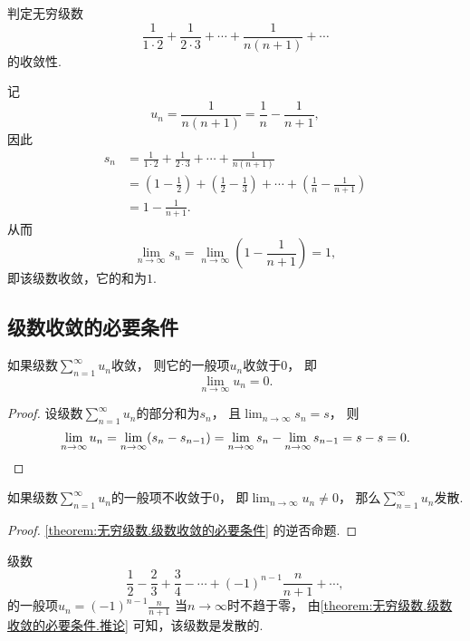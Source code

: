 \begin{example}
判定无穷级数\[
\frac{1}{1\cdot2}+\frac{1}{2\cdot3}+\dotsb+\frac{1}{n(n+1)}+\dotsb
\]的收敛性.
\begin{solution}
记\[
	u_n = \frac{1}{n(n+1)} = \frac{1}{n}-\frac{1}{n+1},
\]
因此\begin{align*}
	s_n &= \frac{1}{1\cdot2}+\frac{1}{2\cdot3}+\dotsb+\frac{1}{n(n+1)} \\
	&= \left(1-\frac{1}{2}\right)+\left(\frac{1}{2}-\frac{1}{3}\right)
	+\dotsb+\left(\frac{1}{n}-\frac{1}{n+1}\right) \\
	&= 1-\frac{1}{n+1}.
\end{align*}
从而\[
	\lim_{n\to\infty} s_n
	= \lim_{n\to\infty} \left(1-\frac{1}{n+1}\right)
	= 1,
\]
即该级数收敛，它的和为\(1\).
\end{solution}
\end{example}

\subsection{级数收敛的必要条件}
\begin{proposition}[级数收敛的必要条件]\label{theorem:无穷级数.级数收敛的必要条件}
如果级数\(\sum_{n=1}^\infty u_n\)收敛，
则它的一般项\(u_n\)收敛于\(0\)，
即\[
	\lim_{n\to\infty} u_n = 0.
\]
\begin{proof}
设级数\(\sum_{n=1}^\infty u_n\)的部分和为\(s_n\)，
且\(\lim_{n\to\infty} s_n = s\)，
则\[
	\lim_{n\to\infty} u_n
	= \lim_{n\to\infty}(s_n - s_{n-1})
	= \lim_{n\to\infty} s_n - \lim_{n\to\infty} s_{n-1}
	= s - s
	= 0.
	\qedhere
\]
\end{proof}
\end{proposition}

\begin{corollary}\label{theorem:无穷级数.级数收敛的必要条件.推论}
如果级数\(\sum_{n=1}^\infty u_n\)的一般项不收敛于\(0\)，
即\(\lim_{n\to\infty} u_n \neq 0\)，
那么\(\sum_{n=1}^\infty u_n\)发散.
\begin{proof}
\cref{theorem:无穷级数.级数收敛的必要条件} 的逆否命题.
\end{proof}
\end{corollary}

\begin{example}
级数\[
	\frac12-\frac23+\frac34-\dotsb+(-1)^{n-1}\frac{n}{n+1}+\dotsb,
\]的一般项\(u_n = (-1)^{n-1} \frac{n}{n+1}\)
当\(n\to\infty\)时不趋于零，
由\cref{theorem:无穷级数.级数收敛的必要条件.推论} 可知，该级数是发散的.
\end{example}

